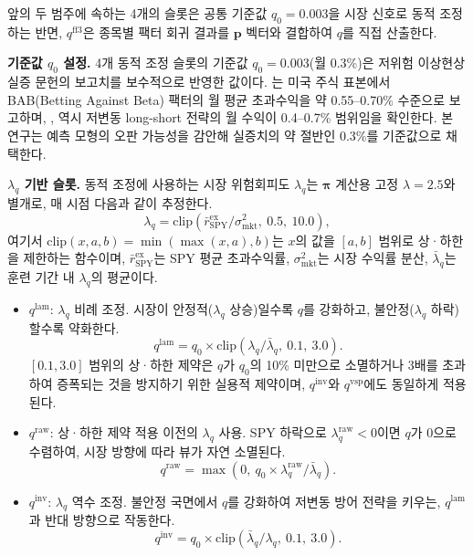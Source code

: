 \documentclass[eng]{kjas3}
\begin{document}
앞의 두 범주에 속하는 4개의 슬롯은 공통 기준값 $q_0 = 0.003$을 시장 신호로 동적 조정하는 반면, $q^{\mathrm{ff3}}$은 종목별 팩터 회귀 결과를 $\mathbf{p}$ 벡터와 결합하여 $q$를 직접 산출한다.

\textbf{기준값 $q_0$ 설정.} 4개 동적 조정 슬롯의 기준값 $q_0 = 0.003$(월 0.3\%)은 저위험 이상현상 실증 문헌의 보고치를 보수적으로 반영한 값이다. \citet{frazzini2014}는 미국 주식 표본에서 BAB(Betting Against Beta) 팩터의 월 평균 초과수익을 약 0.55--0.70\% 수준으로 보고하며, \citet{baker2011}, \citet{blitz2007} 역시 저변동 long-short 전략의 월 수익이 0.4--0.7\% 범위임을 확인한다. 본 연구는 예측 모형의 오판 가능성을 감안해 실증치의 약 절반인 0.3\%를 기준값으로 채택한다.

\textbf{$\lambda_q$ 기반 슬롯.} 동적 조정에 사용하는 시장 위험회피도 $\lambda_q$는 $\boldsymbol{\pi}$ 계산용 고정 $\lambda = 2.5$와 별개로, 매 시점 다음과 같이 추정한다.
\begin{equation}
  \lambda_q = \mathrm{clip}\!\left(\bar{r}^{\mathrm{ex}}_{\mathrm{SPY}}/\sigma^2_{\mathrm{mkt}},\ 0.5,\ 10.0\right),
\end{equation}
여기서 $\mathrm{clip}(x, a, b) = \min(\max(x, a), b)$는 $x$의 값을 $[a, b]$ 범위로 상·하한을 제한하는 함수이며, $\bar{r}^{\mathrm{ex}}_{\mathrm{SPY}}$는 SPY 평균 초과수익률, $\sigma^2_{\mathrm{mkt}}$는 시장 수익률 분산, $\bar{\lambda}_q$는 훈련 기간 내 $\lambda_q$의 평균이다.

\begin{itemize}
  \item $q^{\mathrm{lam}}$: $\lambda_q$ 비례 조정. 시장이 안정적($\lambda_q$ 상승)일수록 $q$를 강화하고, 불안정($\lambda_q$ 하락)할수록 약화한다.
    \begin{equation}
      q^{\mathrm{lam}} = q_0 \times \mathrm{clip}\!\left(\lambda_q/\bar{\lambda}_q,\ 0.1,\ 3.0\right).
    \end{equation}
    $[0.1, 3.0]$ 범위의 상·하한 제약은 $q$가 $q_0$의 10\% 미만으로 소멸하거나 3배를 초과하여 증폭되는 것을 방지하기 위한 실용적 제약이며, $q^{\mathrm{inv}}$와 $q^{\mathrm{vsp}}$에도 동일하게 적용된다.

  \item $q^{\mathrm{raw}}$: 상·하한 제약 적용 이전의 $\lambda_q$ 사용. SPY 하락으로 $\lambda_q^{\mathrm{raw}} < 0$이면 $q$가 0으로 수렴하여, 시장 방향에 따라 뷰가 자연 소멸된다.
    \begin{equation}
      q^{\mathrm{raw}} = \max\!\left(0,\ q_0\times \lambda_q^{\mathrm{raw}}/\bar{\lambda}_q\right).
    \end{equation}

  \item $q^{\mathrm{inv}}$: $\lambda_q$ 역수 조정. 불안정 국면에서 $q$를 강화하여 저변동 방어 전략을 키우는, $q^{\mathrm{lam}}$과 반대 방향으로 작동한다.
    \begin{equation}
      q^{\mathrm{inv}} = q_0 \times \mathrm{clip}\!\left(\bar{\lambda}_q/\lambda_q,\ 0.1,\ 3.0\right).
    \end{equation}
\end{itemize}
\end{document}
